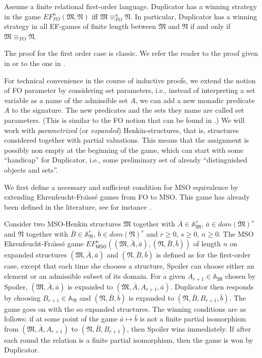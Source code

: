 \documentclass{LMCS}
\newcommand{\frM}{\mathfrak{M}}
\newcommand{\frN}{\mathfrak{N}}
\newcommand{\fo}{\textsf{FO}\xspace}
\newcommand{\mso}{\textsf{MSO}\xspace}
\begin{document}
\begin{thm}[\fo Adequacy]\label{thm:effo}
  Assume a finite relational first-order language. Duplicator has a winning strategy in the game
  $EF_{FO}^n(\frM,\frN)$ iff $\frM\equiv^n_{FO}\frN$. In particular,
  Duplicator has a winning strategy in all EF-games of finite length
  between $\frM$ and $\frN$ if and only if $\frM\equiv_{FO}\frN$.
\end{thm}


The proof for the first order case is classic. We refer the reader
to the proof given in \cite{ebfl95} or to the one in \cite{leo}.

For technical convenience in the course of inductive proofs,
we extend the notion of \fo parameter by considering set
parameters, i.e., instead of interpreting a set variable as a name
of the admissible set $A$, we can add a new monadic predicate $A$ to the
signature. The new predicates and the sets they name are called
set parameters. (This is similar to the \fo notion that can be
found in \cite{97}.) We will work with \emph{parametrized} (or \emph{expanded}) Henkin-structures, that is, structures considered together with partial
valuations. This means that the assignment is possibly non empty at the beginning of the game, which can start with some ``handicap'' for Duplicator, i.e., some preliminary set of already ``distinguished objects and sets''.

We first define a necessary and sufficient condition for \mso
equivalence by extending Ehrenfeucht-Fra\"{\i}ss\'e games from
\fo to \mso. This game has already been defined in the literature, see for instance \cite{1998}.




\begin{defi}[\mso Ehrenfeucht-Fra\"\i ss\'e Game]
Consider two \mso-Henkin structures $\frM$ together with $\bar{A} \in \mathbb{A}_{\frM}^r$,
$\bar{a} \in dom(\frM)^s$ and $\frN$ together with $\bar{B} \in
\mathbb{A}_{\frN}^r$, $\bar{b} \in dom(\frN)^s$ and $r \geq 0$, $s \geq 0$, $n \geq 0$. The \mso
Ehrenfeucht-Fra\"{\i}ss\'e game $EF_\mso^n((\frM, \bar{A}, \bar{a}),
(\frN, \bar{B}, \bar{b}))$ of length $n$ on expanded structures
$(\frM, \bar{A}, \bar{a})$ and $(\frN, \bar{B}, \bar{b})$ is
defined as for the first-order case, except that each time she
chooses a structure, Spoiler can choose either an element or an
admissible subset of its domain. For a given $A_{r+1} \in
\mathbb{A}_{\frM}$ chosen by Spoiler, $(\frM, \bar{A}, \bar{a})$
is expanded to $(\frM, \bar{A}, A_{r+1}, \bar{a})$. Duplicator
then responds by choosing $B_{r+1} \in \mathbb{A}_{\frN}$ and
$(\frN, \bar{B}, \bar{b})$ is expanded to $(\frN, \bar{B},
B_{r+1}, \bar{b})$. The game goes on with the so expanded structures.
The winning conditions are as follows: if at some point of the
game $\bar{a} \mapsto \bar{b}$ is not a finite partial isomorphism
from $(\frM, \bar{A}, A_{r+1})$ to $(\frN, \bar{B}, B_{r+1})$,
then Spoiler wins immediately. If after each round the relation is
a finite partial isomorphism, then the game is won by
Duplicator.
\label{efmso}
\end{defi}
\end{document}
